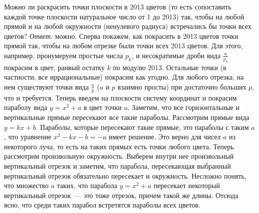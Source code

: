 \problem{}
Можно ли раскрасить точки плоскости в 2013 цветов
(то есть сопоставить каждой точке плоскости натуральное число от 1 до 2013)
так, чтобы на любой прямой и на любой окружности (ненулевого радиуса)
встречались бы точки всех цветов?
\solution
\emph{Ответ:} можно.
Сперва покажем, как покрасить в 2013 цветов точки прямой так, чтобы на любом
отрезке были точки всех 2013 цветов.
Для этого, например, пронумеруем простые числа $p_k$, и несократимые дроби вида
$\frac{a}{p_k}$ покрасим в цвет,
ранвый остатку $k$ по модулю 2013.
Остальные точки (в частности, все иррациональные) покрасим как угодно.
Для любого отрезка, на нем существуют точки вида $\frac{a}{p}$
($a$ и $p$ взаимно просты) при достаточно больших $p$, что и требуется.
Теперь введем на плоскости систему координат и покрасим параболу вида
$y = x^2 + a$ в цвет точки $a$.
Заметим, что все горизонтальные и вертикальные прямые пересекают все такие
параболы.
Рассмотрим прямые вида $y = k x + b$.
Параболы, которые пересекают такие прямые, это параболы с таким $a$, что
уравнение $x^2 - k x - b = -a$ имеет решение.
Это верно для чисел $a$ из некоторого луча, то есть на таких прямых есть точки
любого цвета.
Теперь рассмотрим произвольную окружность.
Выберем внутри нее произвольный вертикальный отрезок и заметим, что парабола,
пересекающая выбранный вертикальный отрезок обязательно пересекает и
окружность.
Несложно понять, что множество $a$ таких, что парабола $y = x^2 + a$ пересекает
некоторый вертикальный отрезок~--- это тоже отрезок, причем такой же длины.
Отсюда ясно, что среди таких парабол встретятся параболы всех цветов.
\endproblem
